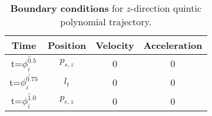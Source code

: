 \begin{table}[t]
\setlength{\abovecaptionskip}{0.cm}
\setlength{\belowcaptionskip}{-0.cm}
    \centering
    \caption{\small \textbf{Boundary conditions} for $z$-direction quintic polynomial trajectory.}
    \label{tab:boundary_condition}
\begin{tabular}{cccc}
\toprule
Time                & Position  & Velocity & Acceleration \\ \midrule
t=$\bar{\phi_i^{0.5}}$  & $p_{s,z}$ & 0        & 0            \\
t=$\bar{\phi_i^{0.75}}$ & $l_t$     & 0        & 0            \\
t=$\bar{\phi_i^{1.0}}$  & $p_{e,z}$ & 0        & 0            \\ \bottomrule
\end{tabular}
\end{table}